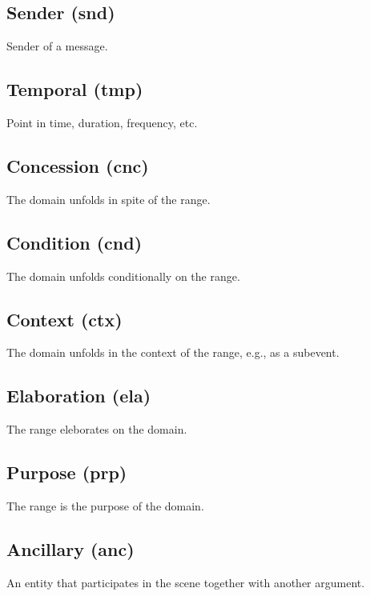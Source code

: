 \documentclass[a4paper]{article}
\begin{document}
\subsection{Sender (snd)}

Sender of a message.

\subsection{Temporal (tmp)}

Point in time, duration, frequency, etc.


\subsection{Concession (cnc)}

The domain unfolds in spite of the range.

\subsection{Condition (cnd)}

The domain unfolds conditionally on the range.

\subsection{Context (ctx)}

The domain unfolds in the context of the range, e.g., as a subevent.

\subsection{Elaboration (ela)}

The range eleborates on the domain.

\subsection{Purpose (prp)}

The range is the purpose of the domain.

\subsection{Ancillary (anc)}

An entity that participates in the scene together with another argument.
\end{document}
